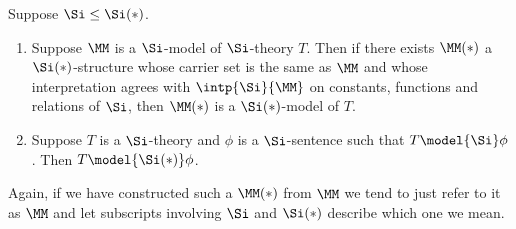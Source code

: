 \begin{lem} 
    Suppose $\Si \leq \Si(*)$.
    \begin{enumerate}
        \item Suppose $\MM$ is a $\Si$-model of $\Si$-theory $T$.
            Then if there exists $\MM(*)$ a $\Si(*)$-structure 
            whose carrier set is the same as $\MM$
            and whose interpretation agrees with $\intp{\Si}{\MM}$ 
            on constants, functions and relations of $\Si$,
            then $\MM(*)$ is a $\Si(*)$-model of $T$.
        \item Suppose $T$ is a $\Si$-theory and $\phi$ is a 
            $\Si$-sentence such that $T \model{\Si} \phi$.
            Then $T \model{\Si(*)} \phi$.
    \end{enumerate}
    Again, if we have constructed such a $\MM(*)$ from $\MM$
    we tend to just refer to it as $\MM$ and let subscripts involving 
    $\Si$ and $\Si(*)$ describe which one we mean.
\end{lem}
